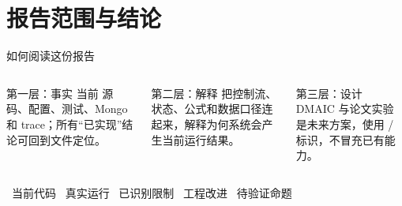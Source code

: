 \section{报告范围与结论}

\begin{frame}{如何阅读这份报告}
\begin{columns}[T,onlytextwidth]
\begin{block}{第一层：事实}
当前  源码、配置、测试、Mongo 和 trace；所有“已实现”结论可回到文件定位。
\end{block}
\begin{block}{第二层：解释}
把控制流、状态、公式和数据口径连起来，解释为何系统会产生当前运行结果。
\end{block}
\begin{block}{第三层：设计}
DMAIC 与论文实验是未来方案，使用 \proposal/\research 标识，不冒充已有能力。
\end{block}
\end{columns}

\vspace{0.5em}
\begin{center}
\impl\ 当前代码 \quad
\obs\ 真实运行 \quad
\risk\ 已识别限制 \quad
\proposal\ 工程改进 \quad
\research\ 待验证命题
\end{center}

\end{frame}

